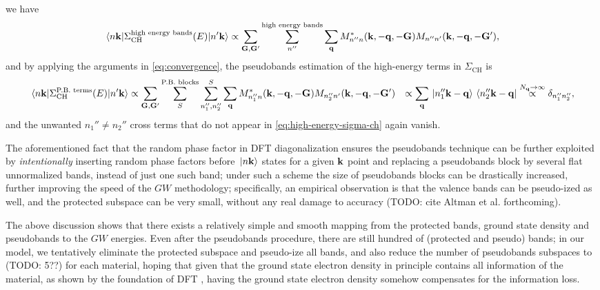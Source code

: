 \documentclass[hyperref, a4paper]{article}
\def\\{}%
\begin{document}
we have 
\begin{equation}
    \mel*{n \vb{k}}{\Sigma_{\text{CH}}^{\text{high energy bands}}(E)}{n' \vb{k}} \propto 
    \sum_{\vb{G}, \vb{G}'} \sum_{n''}^{\text{high energy bands}} \sum_{\vb{q}} M^*_{n'' n}(\vb{k}, - \vb{q}, -\vb{G})
    M_{n'' n'}(\vb{k}, - \vb{q}, - \vb{G}'),
    \label{eq:high-energy-sigma-ch}
\end{equation}
and by applying the arguments in \eqref{eq:convergence}, 
the pseudobands estimation of the high-energy terms in $\Sigma_{\text{CH}}$ is 
\begin{equation}
    \begin{aligned}
        \mel*{n \vb{k}}{\Sigma_{\text{CH}}^{\text{P.B. terms}}(E)}{n' \vb{k}} &\propto 
        \sum_{\vb{G}, \vb{G}'} \sum_{S}^{\text{P.B. blocks}} \sum_{n''_1, n''_2}^{S} \sum_{\vb{q}}
        M^*_{n''_1 n}(\vb{k}, - \vb{q}, -\vb{G})
        M_{n''_2 n'}(\vb{k}, - \vb{q}, - \vb{G}') \\
        &\propto \sum_{\vb{q}} \ket*{n_1'' \vb{k} - \vb{q}} \bra*{n_2'' \vb{k} - \vb{q}}
        \stackrel{N_{\vb{q}} \to \infty}{\propto} \delta_{n_1'' n_2''},
    \end{aligned}
\end{equation}
and the unwanted $n_1'' \neq n_2''$ cross terms that do not appear in \eqref{eq:high-energy-sigma-ch} again vanish.

The aforementioned fact that the random phase factor in DFT diagonalization 
ensures the pseudobands technique can be further exploited by 
\emph{intentionally} inserting random phase factors before $\ket*{n \vb{k}}$ states 
for a given $\vb{k}$ point
and replacing a pseudobands block by several flat unnormalized bands, 
instead of just one such band;
under such a scheme the size of pseudobands blocks can be drastically increased, 
further improving the speed of the $GW$ methodology;
specifically, an empirical observation is that 
the valence bands can be pseudo-ized as well,
and the protected subspace can be very small, 
without any real damage to accuracy (TODO: cite Altman et al. forthcoming).

The above discussion shows that there exists a relatively simple and smooth mapping
from the protected bands, ground state density and pseudobands to the $GW$ energies.
Even after the pseudobands procedure, 
there are still hundred of (protected and pseudo) bands;
in our model, we tentatively eliminate the protected subspace 
and pseudo-ize all bands, 
and also reduce the number of pseudobands subspaces to (TODO: 5??) for each material,
hoping that given that the ground state electron density 
in principle contains all information of the material,
as shown by the foundation of DFT \cite{hohenberg1964inhomogeneous},
having the ground state electron density somehow compensates for the information loss.

\printbibliography
\end{document}
